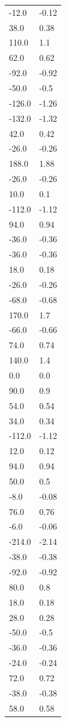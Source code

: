 \begin{longtable}{ll}
-12.0 & -0.12 \\
38.0 & 0.38 \\
110.0 & 1.1 \\
62.0 & 0.62 \\
-92.0 & -0.92 \\
-50.0 & -0.5 \\
-126.0 & -1.26 \\
-132.0 & -1.32 \\
42.0 & 0.42 \\
-26.0 & -0.26 \\
188.0 & 1.88 \\
-26.0 & -0.26 \\
10.0 & 0.1 \\
-112.0 & -1.12 \\
94.0 & 0.94 \\
-36.0 & -0.36 \\
-36.0 & -0.36 \\
18.0 & 0.18 \\
-26.0 & -0.26 \\
-68.0 & -0.68 \\
170.0 & 1.7 \\
-66.0 & -0.66 \\
74.0 & 0.74 \\
140.0 & 1.4 \\
0.0 & 0.0 \\
90.0 & 0.9 \\
54.0 & 0.54 \\
34.0 & 0.34 \\
-112.0 & -1.12 \\
12.0 & 0.12 \\
94.0 & 0.94 \\
50.0 & 0.5 \\
-8.0 & -0.08 \\
76.0 & 0.76 \\
-6.0 & -0.06 \\
-214.0 & -2.14 \\
-38.0 & -0.38 \\
-92.0 & -0.92 \\
80.0 & 0.8 \\
18.0 & 0.18 \\
28.0 & 0.28 \\
-50.0 & -0.5 \\
-36.0 & -0.36 \\
-24.0 & -0.24 \\
72.0 & 0.72 \\
-38.0 & -0.38 \\
58.0 & 0.58 \\

\end{longtable}

